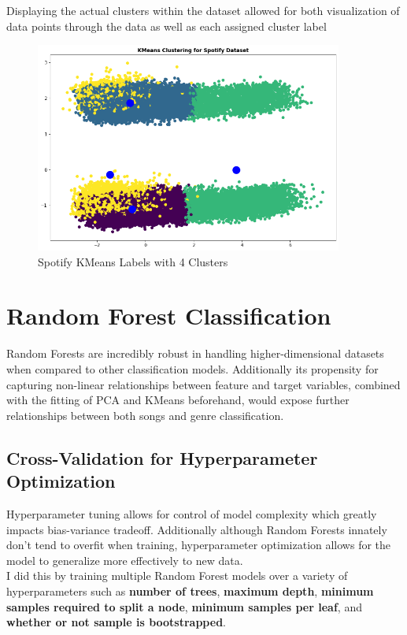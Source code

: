 \documentclass[12pt]{article}
\begin{document}
\noindent
Displaying the actual clusters within the dataset allowed for both visualization of data points through the data as well as each assigned cluster label

\begin{figure}[htbp]
  \centering
  \vspace{-0.075cm}
  \includegraphics[width=0.9\textwidth]{kmeans_clustering.png}
  \caption{Spotify KMeans Labels with 4 Clusters}
  \label{Spotify KMeans labeling}
\end{figure}

\section{Random Forest Classification}
Random Forests are incredibly robust in handling higher-dimensional datasets when compared to other classification models. Additionally its propensity for capturing non-linear relationships between feature and target variables, combined with the fitting of PCA and KMeans beforehand, would expose further relationships between both songs and genre classification. 

\subsection*{Cross-Validation for Hyperparameter Optimization}
Hyperparameter tuning allows for control of model complexity which greatly impacts bias-variance tradeoff. Additionally although Random Forests innately don't tend to overfit when training, hyperparameter optimization allows for the model to generalize more effectively to new data. \\

\noindent
I did this by training multiple Random Forest models over a variety of hyperparameters such as \textbf{number of trees}, \textbf{maximum depth}, \textbf{minimum samples required to split a node}, \textbf{minimum samples per leaf}, and \textbf{whether or not sample is bootstrapped}. \\ 
\end{document}
